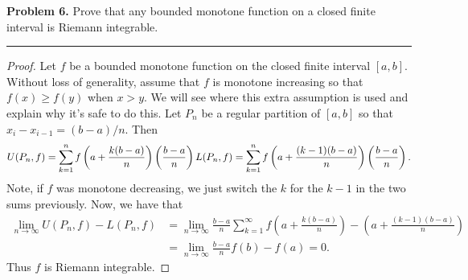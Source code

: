 \documentclass[leqno]{article}
\theoremstyle{nonumberplain}
\newtheorem{proof}{Proof}
\begin{document}
\pagebreak



\noindent\textbf{Problem 6.} \quad
Prove that any bounded monotone function on a closed finite interval is Riemann integrable.

\noindent\rule[0.5ex]{\linewidth}{1pt}

\begin{proof}
Let $f$ be a bounded monotone function on the closed finite interval $[a,b]$.  Without loss of generality, assume that $f$ is monotone increasing so that $f(x)\geq f(y)$ when $x>y$. We will see where this extra assumption is used and explain why it's safe to do this.   Let $P_n$ be a regular partition of $[a,b]$ so that $x_i-x_{i-1}=(b-a)/n$.  Then
\[
U(P_n,f)= \sum_{k=1}^n f\left(a+\frac{k(b-a)}{n}\right) \left( \frac{b-a}{n} \right) \\
L(P_n,f)=\sum_{k=1}^n f\left(a+\frac{(k-1)(b-a)}{n} \right) \left( \frac{b-a}{n} \right).
\]
Note, if $f$ was monotone decreasing, we just switch the $k$ for the $k-1$ in the two sums previously.  Now, we have that
\begin{align*}
\lim_{n\to \infty} U(P_n,f)-L(P_n,f)&= \lim_{n\to \infty}\frac{b-a}{n} \sum_{k=1}^\infty f \left( a+\frac{k(b-a)}{n} \right) - \left( a + \frac{(k-1)(b-a)}{n} \right)\\
&=\lim_{n\to \infty}\frac{b-a}{n}f(b)-f(a)=0.
\end{align*}
Thus $f$ is Riemann integrable.
\end{proof}

\pagebreak
\end{document}
